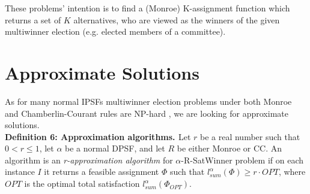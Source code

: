 These problems' intention is to find a (Monroe) K-assignment function which returns a set of $K$ alternatives, who are viewed as the winners of the given multiwinner election (e.g. elected members of a committee).

\section{Approximate Solutions}

As for many normal IPSFs multiwinner election problems under both Monroe and Chamberlin-Courant rules are NP-hard \cite{2,3}, we are looking for approximate solutions.
\\

\noindent
\textbf{Definition 6: Approximation algorithms. \cite{1}} \hspace{.1in} Let $r$ be a real number such that $0 < r \leq 1$, let $\alpha$ be a normal DPSF, and let $R$ be either Monroe or CC. An algorithm is an \textit{r-approximation algorithm} for $\alpha$-R-SatWinner problem if on each instance $I$ it returns a feasible assignment $\Phi$ such that $l^{\alpha}_{sum}(\Phi) \geq r \cdot OPT$, where $OPT$ is the optimal total satisfaction $l^{\alpha}_{sum}(\Phi_{OPT})$.
\\
